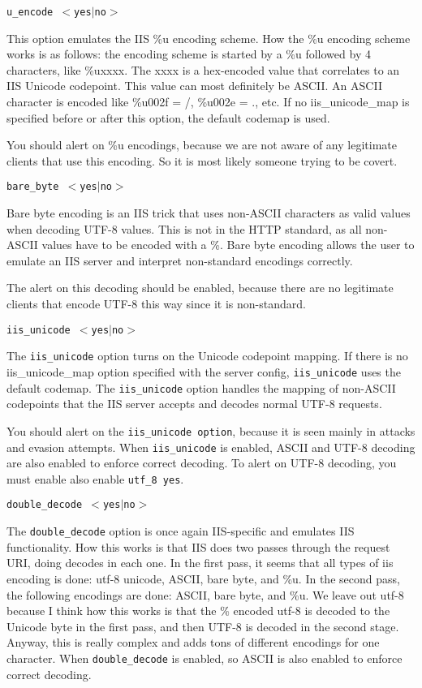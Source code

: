 \documentclass[english]{report}
\newcounter{slistnum}
\newenvironment{slist}
{ \begin{list}{ {\bf \arabic{slistnum}.} }{\usecounter{slistnum} } }
{ \end{list} }
\begin{document}
\begin{slist}
\item \texttt{u\_encode $<$yes$|$no$>$}

This option emulates the IIS \%u encoding scheme.  How the \%u encoding scheme
works is as follows:  the encoding scheme is started by a \%u followed by 4
characters, like \%uxxxx.  The xxxx is a hex-encoded value that correlates to
an IIS Unicode codepoint.  This value can most definitely be ASCII.  An ASCII
character is encoded like \%u002f = /, \%u002e = ., etc.  If no
iis\_unicode\_map is specified before or after this option, the default codemap
is used.

You should alert on \%u encodings, because we are not aware of any legitimate
clients that use this encoding.  So it is most likely someone trying to be
covert.

\item \texttt{bare\_byte $<$yes$|$no$>$}

Bare byte encoding is an IIS trick that uses non-ASCII characters as valid
values when decoding UTF-8 values.  This is not in the HTTP standard, as all
non-ASCII values have to be encoded with a \%.  Bare byte encoding allows the
user to emulate an IIS server and interpret non-standard encodings correctly.

The alert on this decoding should be enabled, because there are no legitimate
clients that encode UTF-8 this way since it is non-standard.

\item \texttt{iis\_unicode $<$yes$|$no$>$}

The \texttt{iis\_unicode} option turns on the Unicode codepoint mapping.  If
there is no iis\_unicode\_map option specified with the server config,
\texttt{iis\_unicode} uses the default codemap.  The \texttt{iis\_unicode}
option handles the mapping of non-ASCII codepoints that the IIS server accepts
and decodes normal UTF-8 requests.

You should alert on the \texttt{iis\_unicode option}, because it is seen mainly
in attacks and evasion attempts.  When \texttt{iis\_unicode} is enabled, ASCII
and UTF-8 decoding are also enabled to enforce correct decoding.  To alert on
UTF-8 decoding, you must enable also enable \texttt{utf\_8 yes}. 

\item \texttt{double\_decode $<$yes$|$no$>$}

The \texttt{double\_decode} option is once again IIS-specific and emulates IIS
functionality.  How this works is that IIS does two passes through the request
URI, doing decodes in each one.  In the first pass, it seems that all types of
iis encoding is done: utf-8 unicode, ASCII, bare byte, and \%u.  In the second
pass, the following encodings are done:  ASCII, bare byte, and \%u.  We leave
out utf-8 because I think how this works is that the \% encoded utf-8 is
decoded to the Unicode byte in the first pass, and then UTF-8 is decoded in the
second stage.  Anyway, this is really complex and adds tons of different
encodings for one character.  When \texttt{double\_decode} is enabled, so ASCII
is also enabled to enforce correct decoding.


\end{slist}
\end{document}
